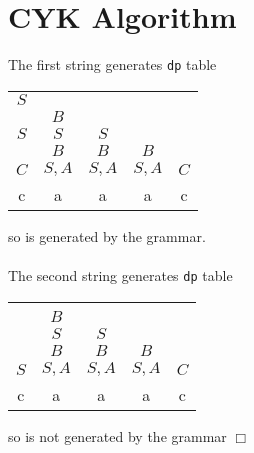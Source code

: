 \documentclass{article}
\begin{document}
\section*{CYK Algorithm}
The first string generates \verb|dp| table

\begin{tabular}{|*5{c|}}
\cline{1-1}
$S$&\multicolumn{4}{c}{}\\
\cline{1-2}
&$B$&\multicolumn{3}{c}{}\\
\cline{1-3}
$S$&$S$&$S$&\multicolumn{2}{c}{}\\
\cline{1-4}
&$B$&$B$&$B$&\multicolumn{1}{c}{}\\
\cline{1-5}
$C$&$S,A$&$S,A$&$S,A$&$C$\\
\hline
c&a&a&a&c\\
\end{tabular}

\noindent
so is generated by the grammar.\\\\
The second string generates \verb|dp| table

\begin{tabular}{|*5{c|}}
\cline{1-1}
&\multicolumn{4}{c}{}\\
\cline{1-2}
&$B$&\multicolumn{3}{c}{}\\
\cline{1-3}
&$S$&$S$&\multicolumn{2}{c}{}\\
\cline{1-4}
&$B$&$B$&$B$&\multicolumn{1}{c}{}\\
\cline{1-5}
$S$&$S,A$&$S,A$&$S,A$&$C$\\
\hline
c&a&a&a&c\\
\end{tabular}

\noindent
so is not generated by the grammar $\Box$
\end{document}
